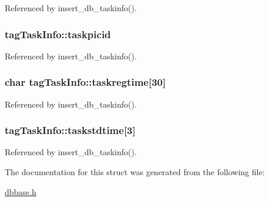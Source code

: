 Referenced by insert\-\_\-db\-\_\-taskinfo().

\hypertarget{structtagTaskInfo_a03374b945d755b48d16cb94cdd2b72df}{
\subsubsection[{taskpicid}]{ tag\-Task\-Info\-::taskpicid}}\label{structtagTaskInfo_a03374b945d755b48d16cb94cdd2b72df}


Referenced by insert\-\_\-db\-\_\-taskinfo().

\hypertarget{structtagTaskInfo_a08261297cc1ffa0ad847ff6850046886}{
\subsubsection[{taskregtime}]{\setlength{\rightskip}{0pt plus 5cm}char tag\-Task\-Info\-::taskregtime\mbox{[}30\mbox{]}}}\label{structtagTaskInfo_a08261297cc1ffa0ad847ff6850046886}


Referenced by insert\-\_\-db\-\_\-taskinfo().

\hypertarget{structtagTaskInfo_a09cf745df5ab0c3a9aace2f0f85eeb7a}{
\subsubsection[{taskstdtime}]{ tag\-Task\-Info\-::taskstdtime\mbox{[}3\mbox{]}}}\label{structtagTaskInfo_a09cf745df5ab0c3a9aace2f0f85eeb7a}


Referenced by insert\-\_\-db\-\_\-taskinfo().



The documentation for this struct was generated from the following file\-:\begin{DoxyCompactItemize}
\item 
\hyperlink{dbbase_8h}{dbbase.\-h}\end{DoxyCompactItemize}
